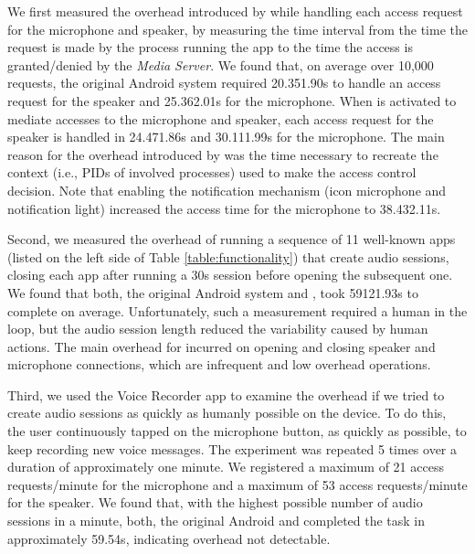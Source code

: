 We first measured the overhead introduced by \system while handling each access request for the microphone and speaker, by measuring the time interval from the time the request is made by the process running the app to the time the access is granted/denied by the \emph{Media Server}. We found that, on average over 10,000 requests, the original Android system required 20.351.90s to handle an access request for the speaker and 25.362.01s for the microphone. When \system is activated to mediate accesses to the microphone and speaker, each access request for the speaker is handled in 24.471.86s and 30.111.99s for the microphone. The main reason for the overhead introduced by \system was the time necessary to recreate the context (i.e., PIDs of involved processes) used to make the access control decision. Note that enabling the \system notification mechanism (icon microphone and notification light) increased the access time for the microphone to 38.432.11s.

Second, we measured the overhead of running a sequence of 11 well-known apps (listed on the left side of Table \ref{table:functionality}) that create audio sessions, closing each app after running a 30s session before opening the subsequent one. We found that both, the original Android system and \system, took 59121.93s to complete on average.  Unfortunately, such a measurement required a human in the loop, but the audio session length reduced the variability caused by human actions.  The main overhead for \system incurred on opening and closing speaker and microphone connections, which are infrequent and low overhead operations.

Third, we used the Voice Recorder app to examine the overhead if we tried to create audio sessions as quickly as humanly possible on the device.  To do this, the user continuously tapped on the microphone button, as quickly as possible, to keep recording new voice messages. The experiment was repeated 5 times over a duration of approximately one minute. We registered a maximum of 21 access requests/minute for the microphone and a maximum of 53 access requests/minute for the speaker. We found that, with the highest possible number of audio sessions in a minute, both, the original Android and \system completed the task in approximately 59.54s, indicating overhead not detectable.




 



